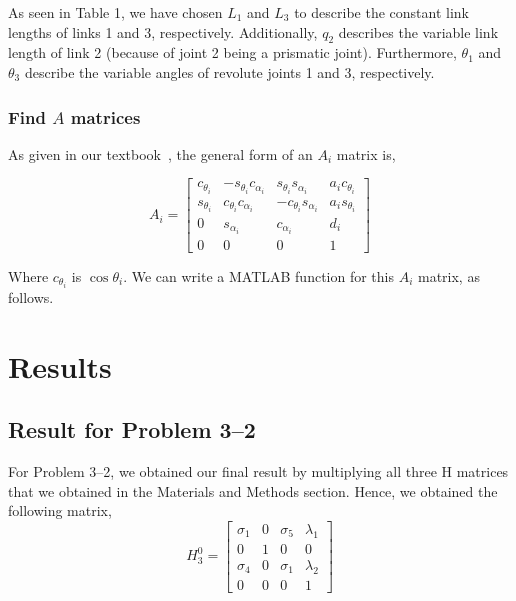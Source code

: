 \documentclass[conference]{IEEEtran}
\begin{document}
As seen in Table 1, we have chosen $L_1$ and $L_3$ to describe the constant link
lengths of links 1 and 3, respectively. Additionally, $q_2$ describes the variable
link length of link 2 (because of joint 2 being a prismatic joint).
Furthermore, $\theta_1$ and $\theta_3$ describe the
variable angles of revolute joints 1 and 3, respectively.

\subsubsection{Find $A$ matrices}

As given in our textbook~\cite{Spong2006}, the general form of an
$A_i$ matrix is,

\[
    A_i =
    \begin{bmatrix}
        c_{\theta_i} & -s_{\theta_i}c_{\alpha_i} & s_{\theta_i}s_{\alpha_i} & a_i c_{\theta_i}\\
        s_{\theta_i} & c_{\theta_i}c_{\alpha_i} & -c_{\theta_i}s_{\alpha_i} & a_i s_{\theta_i}\\
        0 & s_{\alpha_i} & c_{\alpha_i} & d_i\\
        0 & 0 & 0 & 1
    \end{bmatrix}
\]

Where $c_{\theta_i}$ is $\cos{\theta_i}$.
We can write a MATLAB function for this $A_i$ matrix, as follows.



\section{Results}

\subsection{Result for Problem 3--2}

For Problem 3--2, we obtained our final result by multiplying all three H matrices
that we obtained in the Materials and Methods section. Hence, we obtained the following
matrix,
\[
    H^0_3 =
    \begin{bmatrix}
    \sigma_1  & 0 & \sigma_5  & \lambda_1 \\
    0 & 1 & 0 & 0\\
    \sigma_4 & 0 & \sigma_1  & \lambda_2 \\
    0 & 0 & 0 & 1
    \end{bmatrix}
\]
\end{document}

